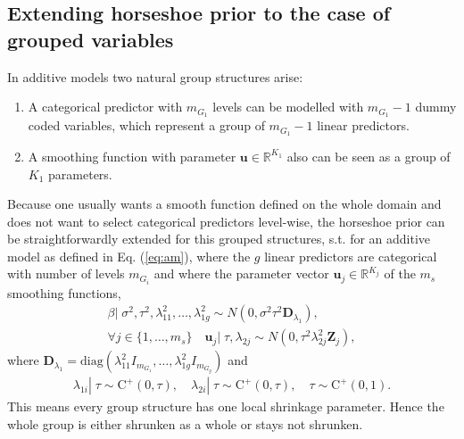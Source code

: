 \documentclass[12pt,letterpaper]{article}
\numberwithin{equation}{subsection}
\begin{document}
\subsection{Extending horseshoe prior to the case of grouped variables}
\label{sec:hsg}
In additive models two natural group structures arise:
\begin{enumerate}
\item A categorical predictor with $m_{G_1}$ levels can be modelled with $m_{G_1} -1$ dummy coded variables, which represent a group of $m_{G_1} - 1$ linear predictors.
\item A smoothing function with parameter $\mathbf{u} \in \mathbb{R}^{K_1}$ also can be seen as a group of $K_1$ parameters. 
\end{enumerate}
Because one usually wants a smooth function defined on the whole domain and does not want to select categorical predictors level-wise, the horseshoe prior can be straightforwardly extended for this grouped structures, s.t. for an additive model as defined in Eq. (\ref{eq:am}), where the $g$ linear predictors are categorical with number of levels $m_{G_i}$ and where the parameter vector $\mathbf{u}_j \in \mathbb{R}^{K_j}$ of the $m_s$ smoothing functions,
\begin{align}
\beta|\; \sigma^2,\tau^2, \lambda^2_{11},\dots,\lambda^2_{1g} \sim N(0, \sigma^2\tau^2\mathbf{D}_{\lambda_1}),\\
\forall j \in  \{1,\dots,m_s\}\quad \mathbf{u}_j|\; \tau, \lambda_{2j}  \sim N(0, \tau^2\lambda_{2j}^2\mathbf{Z}_j),
\end{align}
where $\mathbf{D}_{\lambda_1} = \text{diag}(\lambda_{11}^2I_{m_{G_1}},\dots,\lambda_{1g}^2I_{m_{G_g}})$ and 
\begin{align*}
\lambda_{1i}|\;\tau \sim \text{C}^+(0,\tau), \quad \lambda_{2i}|\;\tau \sim \text{C}^+(0,\tau), \quad \tau \sim \text{C}^+(0,1).
\end{align*}
This means every group structure has one local shrinkage parameter. Hence the whole group is either shrunken as a whole or stays not shrunken.
\end{document}
